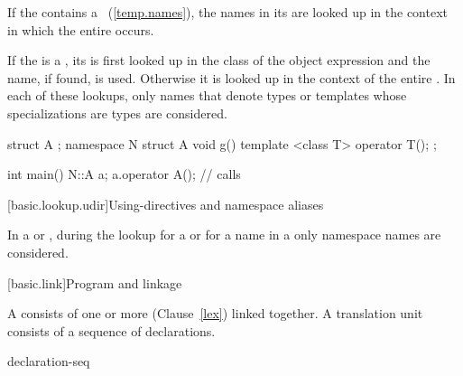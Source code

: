 \pnum
If the  contains a
~(\ref{temp.names}), the names in its
 are looked up in the context in which the
entire  occurs.

\pnum
If the  is a ,
its 
is first looked up in the class of the object expression and the name, if
found, is used. Otherwise it is looked up in the context
of the entire .
In each of these lookups, only names that denote types or templates whose
specializations are types are considered.
\begin{example}
\begin{codeblock}
struct A { };
namespace N {
  struct A {
    void g() { }
    template <class T> operator T();
  };
}

int main() {
  N::A a;
  a.operator A();               // calls 
}
\end{codeblock}
\end{example}

[basic.lookup.udir]{Using-directives and namespace aliases}

\pnum
{}%
%
In a  or ,
during the lookup for a  or for a name in a
only namespace names are considered.%
%

[basic.link]{Program and linkage}%

\pnum
{}%
A  consists of one or more 
(Clause~\ref{lex}) linked together. A translation unit consists
of a sequence of declarations.

\begin{bnf}
\br
    declaration-seq\opt
\end{bnf}

